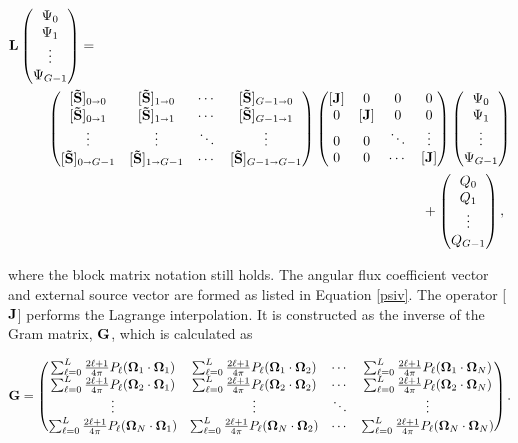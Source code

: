 \begin{align}
    \ve{L}
    &\begin{pmatrix}
      \Psi_0 \\
      \Psi_1 \\
      \vdots   \\
      \Psi_{G-1}  \nonumber
    \end{pmatrix} = \\
    &\qquad\begin{pmatrix}
      [\ve{\st}]_{0\sa 0}   & [\ve{\st}]_{1\sa0}    & \cdots & [\ve{\st}]_{G-1\sa0} \\
      [\ve{\st}]_{0\sa 1}   & [\ve{\st}]_{1\sa1}    & \cdots & [\ve{\st}]_{G-1\sa1} \\
      \vdots                & \vdots                & \ddots & \vdots               \\
      [\ve{\st}]_{0\sa G-1} & [\ve{\st}]_{1\sa G-1} & \cdots & [\ve{\st}]_{G-1 \sa G-1}
    \end{pmatrix}
    \begin{pmatrix}
      [\ve{J}] & 0 & 0 & 0 \\
      0 & [\ve{J}] & 0 & 0 \\
      0 & 0 & \ddots & \vdots \\
      0 & 0 & \cdots & [\ve{J}] \\
    \end{pmatrix}
    \begin{pmatrix}
      \Psi_0 \\
      \Psi_1 \\
      \vdots   \\
      \Psi_{G-1}
    \end{pmatrix}
    \\&\fq\fq\fq\qquad\qquad\quad+
    \begin{pmatrix}
      Q_0 \\
      Q_1 \\
      \vdots  \\
      Q_{G-1} \nonumber
    \end{pmatrix},
\end{align}

\noindent where the block matrix notation still holds. The angular flux coefficient 
vector and external source vector are formed as listed in Equation \ref{psiv}.
The operator [$\mathbf{J}$] performs the Lagrange interpolation. It is constructed as the
inverse of the Gram matrix, $\mathbf{G}$, which is calculated as

\begin{equation}
  \mathbf{G} = \begin{pmatrix}
    \sum_{\ell=0}^L\frac{2\ell+1}{4\pi}P_{\ell}(\mathbf\Omega_1\cdot\mathbf\Omega_1) & \sum_{\ell=0}^L\frac{2\ell+1}{4\pi}P_{\ell}(\mathbf\Omega_1\cdot\mathbf\Omega_2) & \cdots & \sum_{\ell=0}^L\frac{2\ell+1}{4\pi}P_{\ell}(\mathbf\Omega_1\cdot\mathbf\Omega_N) \\
    \sum_{\ell=0}^L\frac{2\ell+1}{4\pi}P_{\ell}(\mathbf\Omega_2\cdot\mathbf\Omega_1) & \sum_{\ell=0}^L\frac{2\ell+1}{4\pi}P_{\ell}(\mathbf\Omega_2\cdot\mathbf\Omega_2) & \cdots & \sum_{\ell=0}^L\frac{2\ell+1}{4\pi}P_{\ell}(\mathbf\Omega_2\cdot\mathbf\Omega_N) \\
    \vdots     & \vdots     & \ddots & \vdots     \\
    \sum_{\ell=0}^L\frac{2\ell+1}{4\pi}P_{\ell}(\mathbf\Omega_N\cdot\mathbf\Omega_1) & \sum_{\ell=0}^L\frac{2\ell+1}{4\pi}P_{\ell}(\mathbf\Omega_N\cdot\mathbf\Omega_2) & \cdots & \sum_{\ell=0}^L\frac{2\ell+1}{4\pi}P_{\ell}(\mathbf\Omega_N\cdot\mathbf\Omega_N) \\
  \end{pmatrix}.
\label{gram}
\end{equation}

